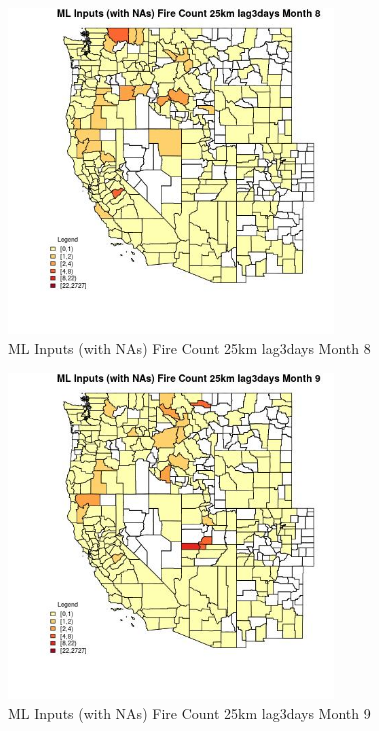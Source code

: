 \begin{figure} 
\centering  
\includegraphics[width=0.77\textwidth]{Code_Outputs/Report_ML_input_PM25_Step4_part_f_de_duplicated_aveswNAs_CountyFire_Count_25km_lag3daysmedianMonth8.jpg} 
\caption{\label{fig:Report_ML_input_PM25_Step4_part_f_de_duplicated_aveswNAsCountyFire_Count_25km_lag3daysmedianMonth8}ML Inputs (with NAs) Fire Count 25km lag3days Month 8} 
\end{figure} 
 

\begin{figure} 
\centering  
\includegraphics[width=0.77\textwidth]{Code_Outputs/Report_ML_input_PM25_Step4_part_f_de_duplicated_aveswNAs_CountyFire_Count_25km_lag3daysmedianMonth9.jpg} 
\caption{\label{fig:Report_ML_input_PM25_Step4_part_f_de_duplicated_aveswNAsCountyFire_Count_25km_lag3daysmedianMonth9}ML Inputs (with NAs) Fire Count 25km lag3days Month 9} 
\end{figure} 
 

